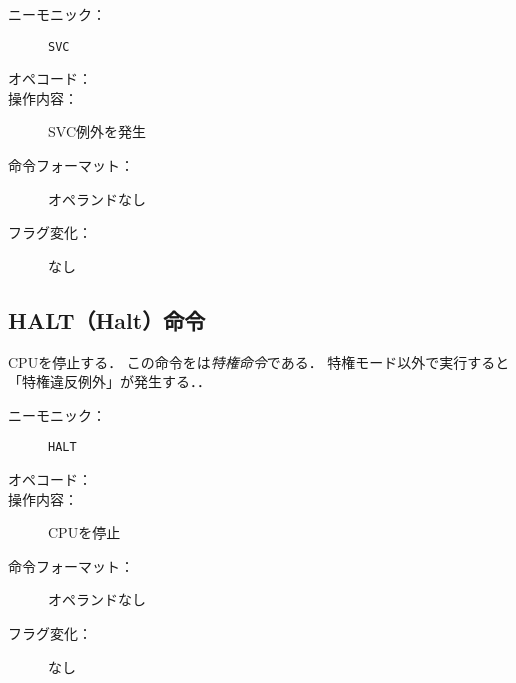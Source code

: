 \begin{description}
\item[ニーモニック：] \texttt{SVC}
\item[オペコード：] 
\item[操作内容：] SVC例外を発生
\item[命令フォーマット：] オペランドなし
\item[フラグ変化：] なし
\end{description}

\subsection{HALT（Halt）命令}
CPUを停止する．
この命令をは\emph{特権命令}である．
特権モード以外で実行すると「特権違反例外」が発生する．．

\begin{description}
\item[ニーモニック：] \texttt{HALT}
\item[オペコード：] 
\item[操作内容：] CPUを停止
\item[命令フォーマット：] オペランドなし
\item[フラグ変化：] なし
\end{description}

